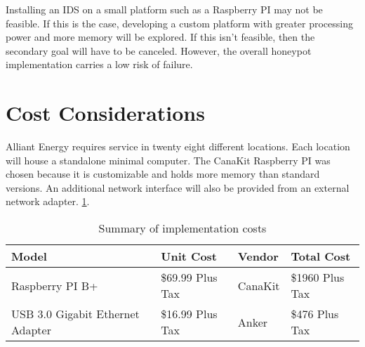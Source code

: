 \addtocounter{footnote}{-1}

\addtocounter{footnote}{1}

\addtocounter{footnote}{1}

Installing an IDS on a small platform such as a Raspberry PI may not be feasible. If this is the case, developing a custom platform with greater processing power and more memory will be explored. If this isn't feasible, then the secondary goal will have to be canceled. However, the overall honeypot implementation carries a low risk of failure.

\section{Cost Considerations}

Alliant Energy requires service in twenty eight different locations. Each location will house a standalone minimal computer. The CanaKit Raspberry PI was chosen because it is customizable and holds more memory than standard versions. An additional network interface will also be provided from an external network adapter. \ref{table:cost}.

\vspace{0.5cm}
\begin{table}[h]
\centering
\begin{tabular}{l l l l}
Model & Unit Cost & Vendor & Total Cost \\
\hline
Raspberry PI B+ & \$69.99 Plus Tax & CanaKit & \$1960 Plus Tax\footnotemark \\
\hline
USB 3.0 Gigabit Ethernet Adapter & \$16.99 Plus Tax & Anker & \$476 Plus Tax\footnotemark\\
\end{tabular}
\caption{Summary of implementation costs}
\label{table:cost}
\end{table}
\vspace{0.5cm}

\addtocounter{footnote}{-1}

\addtocounter{footnote}{1}
